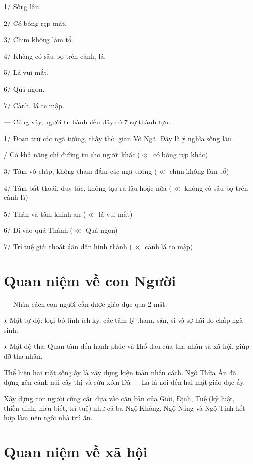 1/ Sống lâu.

2/ Có bóng rợp mát.

3/ Chim không làm tổ.

4/ Không có sâu bọ trên cành, lá.

5/ Lá vui mắt.

6/ Quả ngon.

7/ Cành, lá to mập.



— Cũng vậy, người tu hành đến đây có 7 sự thành tựu:

1/ Đoạn trừ các ngã tưởng, thấy thời gian Vô Ngã. Đây là ý nghĩa sống lâu.

/ Có khả năng chỉ đường tu cho người khác ($\ll$ có bóng rợp khác)

3/ Tâm vô chấp, không tham đắm các ngã tướng ($\ll$ chim không làm tổ)

4/ Tâm bất thoái, duy tác, không tạo ra lậu hoặc nữa ($\ll$ không có sâu bọ trên cành lá)

5/ Thân và tâm khinh an ($\ll$ lá vui mắt)

6/ Đi vào quả Thánh ($\ll$ Quả ngon)

7/ Trí tuệ giải thoát dần dần hình thành ($\ll$ cành lá to mập)

\section{Quan niệm về con Người} %
\label{sec:67_con_nguoi}

 —  Nhân cách con người cần được giáo dục qua 2 mặt:

$\star$ Mặt tự độ: loại bỏ tính ích kỷ, các tâm lý tham, sân, si và sợ hãi do chấp ngã sinh.

$\star$ Mặt độ tha: Quan tâm đến hạnh phúc và khổ đau của tha nhân và xã hội, giúp đỡ tha nhân.

Thể hiện hai mặt sống ấy là xây dựng kiện toàn nhân cách. Ngô Thừa Ân đã dựng nên cảnh núi cây thị và cứu xóm Đà — La là nói đến hai mặt giáo dục ấy.

Xây dựng con người cũng cần dựa vào căn bản của Giới, Định, Tuệ (kỷ luật, thiền định, hiểu biết, trí tuệ) như cả ba Ngộ Không, Ngộ Năng và Ngộ Tịnh kết hợp làm nên ngôi nhà trú ẩn.

\section{Quan niệm về xã hội} %
\label{sec:67_xa_hoi}

